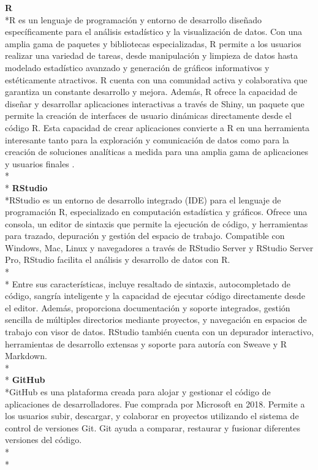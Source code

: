 \documentclass[a4paper,12pt,twoside]{memoir}
\begin{document}
\textbf{R}\\*R es un lenguaje de programación y entorno de desarrollo diseñado específicamente para el análisis estadístico y la visualización de datos. Con una amplia gama de paquetes y bibliotecas especializadas, R permite a los usuarios realizar una variedad de tareas, desde manipulación y limpieza de datos hasta modelado estadístico avanzado y generación de gráficos informativos y estéticamente atractivos. R cuenta con una comunidad activa y colaborativa que garantiza un constante desarrollo y mejora. Además, R ofrece la capacidad de diseñar y desarrollar aplicaciones interactivas a través de Shiny, un paquete que permite la creación de interfaces de usuario dinámicas directamente desde el código R.  Esta capacidad de crear aplicaciones convierte a R en una herramienta interesante tanto para la exploración y comunicación de datos como para la creación de soluciones analíticas a medida para una amplia gama de aplicaciones y usuarios finales \cite{R}.\\*\\*
\textbf{RStudio}\\*RStudio es un entorno de desarrollo integrado (IDE) para el lenguaje de programación R, especializado en computación estadística y gráficos. Ofrece una consola, un editor de sintaxis que permite la ejecución de código, y herramientas para trazado, depuración y gestión del espacio de trabajo. Compatible con Windows, Mac, Linux y navegadores a través de RStudio Server y RStudio Server Pro, RStudio facilita el análisis y desarrollo de datos con R.\\*\\* Entre sus características, incluye resaltado de sintaxis, autocompletado de código, sangría inteligente y la capacidad de ejecutar código directamente desde el editor. Además, proporciona documentación y soporte integrados, gestión sencilla de múltiples directorios mediante proyectos, y navegación en espacios de trabajo con visor de datos. RStudio también cuenta con un depurador interactivo, herramientas de desarrollo extensas y soporte para autoría con Sweave y R Markdown\cite{eswiki:149496820}.\\*\\*
\textbf{GitHub}\\*GitHub es una plataforma creada para alojar y gestionar el código de aplicaciones de desarrolladores. Fue comprada por Microsoft en 2018. Permite a los usuarios subir, descargar, y colaborar en proyectos utilizando el sistema de control de versiones Git. Git ayuda a comparar, restaurar y fusionar diferentes versiones del código.\\*\\*
\end{document}
